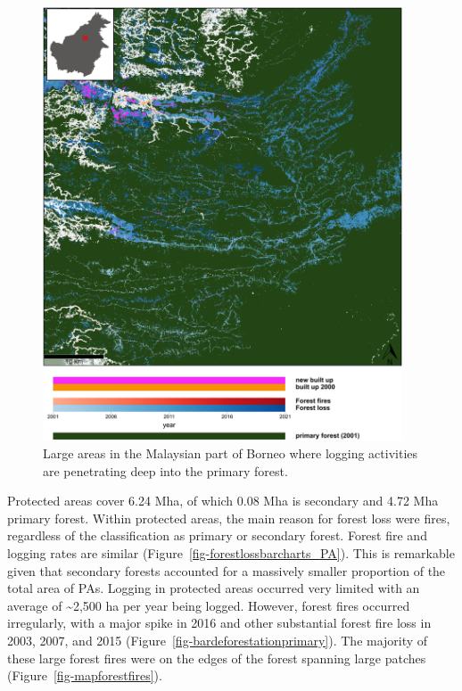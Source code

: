 \documentclass[
  letterpaper,
  DIV=11,
  numbers=noendperiod]{scrreprt}
\begin{document}
\begin{figure}[H]

{\centering \includegraphics[width=0.95\textwidth,height=\textheight]{text/../code/results/maps/primary_deforestation.png}

}

\caption{\label{fig-map_deforestation_primary}Large areas in the
Malaysian part of Borneo where logging activities are penetrating deep
into the primary forest.}

\end{figure}

Protected areas cover 6.24 Mha, of which 0.08 Mha is secondary and 4.72
Mha primary forest. Within protected areas, the main reason for forest
loss were fires, regardless of the classification as primary or
secondary forest. Forest fire and logging rates are similar
(Figure~\ref{fig-forestlossbarcharts_PA}). This is remarkable given that
secondary forests accounted for a massively smaller proportion of the
total area of PAs. Logging in protected areas occurred very limited with
an average of \textasciitilde2,500 ha per year being logged. However,
forest fires occurred irregularly, with a major spike in 2016 and other
substantial forest fire loss in 2003, 2007, and 2015
(Figure~\ref{fig-bardeforestationprimary}). The majority of these large
forest fires were on the edges of the forest spanning large patches
(Figure~\ref{fig-mapforestfires}).
\end{document}
